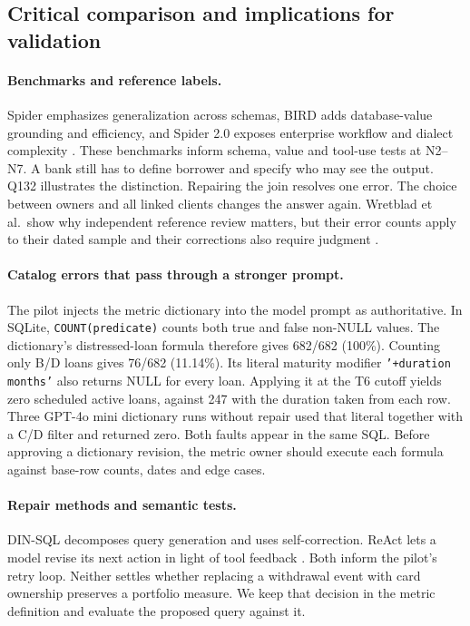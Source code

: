 \documentclass[11pt,a4paper,onecolumn,oneside]{rho-class/rho}
\begin{document}
\clearpage
\subsection{Critical comparison and implications for validation}
\paragraph{Benchmarks and reference labels.}
Spider emphasizes generalization across schemas, BIRD adds database-value grounding and efficiency, and Spider 2.0 exposes enterprise workflow and dialect complexity \citep{spider,bird,spider2}. These benchmarks inform schema, value and tool-use tests at N2--N7. A bank still has to define borrower and specify who may see the output. Q132 illustrates the distinction. Repairing the join resolves one error. The choice between owners and all linked clients changes the answer again. Wretblad et al.\ show why independent reference review matters, but their error counts apply to their dated sample and their corrections also require judgment \citep{wretblad}.

\paragraph{Catalog errors that pass through a stronger prompt.}
The pilot injects the metric dictionary into the model prompt as authoritative. In SQLite, \texttt{COUNT(predicate)} counts both true and false non-NULL values. The dictionary's distressed-loan formula therefore gives 682/682 (100\%). Counting only B/D loans gives 76/682 (11.14\%). Its literal maturity modifier \texttt{'+duration months'} also returns NULL for every loan. Applying it at the T6 cutoff yields zero scheduled active loans, against 247 with the duration taken from each row. Three GPT-4o mini dictionary runs without repair used that literal together with a C/D filter and returned zero. Both faults appear in the same SQL. Before approving a dictionary revision, the metric owner should execute each formula against base-row counts, dates and edge cases.

\paragraph{Repair methods and semantic tests.}
DIN-SQL decomposes query generation and uses self-correction. ReAct lets a model revise its next action in light of tool feedback \citep{dinsql,react}. Both inform the pilot's retry loop. Neither settles whether replacing a withdrawal event with card ownership preserves a portfolio measure. We keep that decision in the metric definition and evaluate the proposed query against it.
\end{document}
